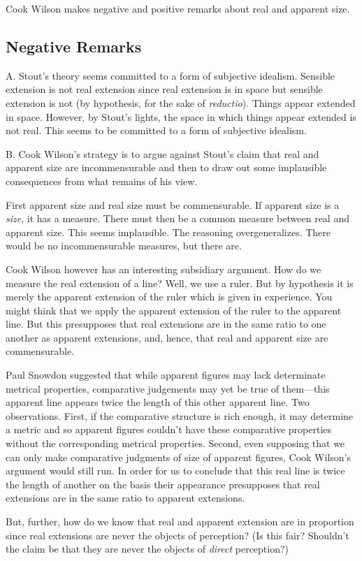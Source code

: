 \documentclass[11pt]{article}
\begin{document}
Cook Wilson makes negative and positive remarks about real and apparent size.

\subsection{Negative Remarks}\label{sub:negative_remarks} %

A. Stout's theory seems committed to a form of subjective idealism. Sensible extension is not real extension since real extension is in space but sensible extension is not (by hypothesis, for the sake of \emph{reductio}). Things appear extended in space. However, by Stout's lights, the space in which things appear extended is not real. This seems to be committed to a form of subjective idealism.
    
B. Cook Wilson's strategy is to argue against Stout's claim that real and apparent size are incommensurable and then to draw out some implausible consequences from what remains of his view. 

First apparent size and real size must be commensurable. If apparent size is a \emph{size}, it has a measure. There must then be a common measure between real and apparent size. This seems implausible. The reasoning overgeneralizes. There would be no incommensurable measures, but there are. 

Cook Wilson however has an interesting subsidiary argument. How do we measure the real extension of a line? Well, we use a ruler. But by hypothesis it is merely the apparent extension of the ruler which is given in experience. You might think that we apply the apparent extension of the ruler to the apparent line. But this presupposes that real extensions are in the same ratio to one another as apparent extensions, and, hence, that real and apparent size are commensurable.

\begin{discussion}
    Paul Snowdon suggested that while apparent figures may lack determinate metrical properties, comparative judgements may yet be true of them---this apparent line appears twice the length of this other apparent line. Two observations. First, if the comparative structure is rich enough, it may determine a metric and so apparent figures couldn't have these comparative properties without the corresponding metrical properties. Second, even supposing that we can only make comparative judgments of size of apparent figures, Cook Wilson's argument would still run. In order for us to conclude that this real line is twice the length of another on the basis their appearance presupposes that real extensions are in the same ratio to apparent extensions.
\end{discussion}

But, further, how do we know that real and apparent extension are in proportion since real extensions are never the objects of perception? (Is this fair? Shouldn't the claim be that they are never the objects of \emph{direct} perception?) 
\end{document}
